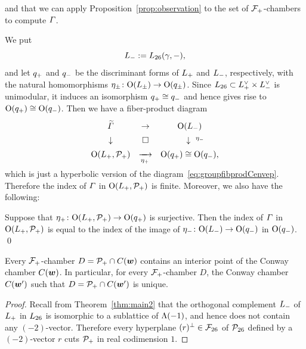 \documentclass{amsart} %
\begin{document}
and that we can apply
Proposition~\ref{prop:observation}
to the set of $\mathord{\mathcal{F}}_{+}$-chambers
to compute $\varGamma$.
%
\par
We put 
\[
L_{-}:=L_{26}(\gamma, -),
\]
and let $q_{+}$ and $q_{-}$ be the discriminant forms 
of $L_{+}$ and $L_{-}$, respectively,
with the natural homomorphisms $\eta_{\pm}\colon \mathord{\mathrm{O}}(L_{\pm})\to \mathord{\mathrm{O}}(q_{\pm})$.
Since  $L_{26}\subset L_{+}^{\vee}\times L_{-}^{\vee}$  is unimodular, 
it  induces an isomorphism $q_{+}\cong q_{-}$ and hence gives rise to 
$\mathord{\mathrm{O}}(q_{+})\cong \mathord{\mathrm{O}}(q_{-})$.
Then we have 
a  fiber-product diagram
%
\begin{equation}\label{eq:groupfibprodP}
\renewcommand{\arraystretch}{1.4}
\begin{array}{ccc}
\tilvGam &\to & \OG(\Lminus) \\
\downarrow & \square& \downarrow\rlap{ ${}^{\etaminus}$} \\
\OG(\Lplus, \PPPplus) & \maprightsb{\etaplus} & \OG(\qplus)\cong \OG(\qminus), 
\end{array}
\end{equation}
% 
which is just 
a hyperbolic version of the diagram~\eqref{eq:groupfibprodCenvep}.
Therefore the index of $\varGamma$ in $\mathord{\mathrm{O}}(L_{+}, \mathord{\mathcal{P}}_{+})$ is finite.
Moreover, we also have the following:
%
\begin{proposition}\label{prop:vGamindex}
Suppose that  %
${\eta}_{+}\colon \mathord{\mathrm{O}}(L_{+}, \mathord{\mathcal{P}}_{+}) \to \mathord{\mathrm{O}}(q_{+})$ is surjective.
Then the  index of $\varGamma$ in $\mathord{\mathrm{O}}(L_{+}, \mathord{\mathcal{P}}_{+})$  
is equal to  the index  of the image 
of ${\eta}_{-}\colon \mathord{\mathrm{O}}(L_{-}) \to \mathord{\mathrm{O}}(q_{-})$ 
in $\mathord{\mathrm{O}}(q_{-})$.
\qed
\end{proposition}
%
%
%
\begin{proposition}\label{prop:interior}
Every $\mathord{\mathcal{F}}_{+}$-chamber $D=\mathord{\mathcal{P}}_{+} \cap \mathord{C}(\boldsymbol{w})$
contains an interior point of the Conway chamber $ \mathord{C}(\boldsymbol{w})$.
In particular, for every $\mathord{\mathcal{F}}_{+}$-chamber $D$,
the Conway chamber $ \mathord{C}(\boldsymbol{w}^{\prime}) $
such that $D=\mathord{\mathcal{P}}_{+} \cap \mathord{C}(\boldsymbol{w}^{\prime})$ is unique.
\end{proposition}
%
\begin{proof}
Recall from Theorem~\ref{thm:main2} that 
the orthogonal complement $L_{-}$
 of $L_{+}$ in $L_{26}$
is isomorphic to a sublattice of $\Lambda(-1)$,
and hence does not contain any $(-2)$-vector.
Therefore every hyperplane $(r)^{\perp}\in {\mathord{\mathcal{F}}}_{26}$ of $\mathord{\mathcal{P}}_{26}$ defined by a $(-2)$-vector $r$ 
cuts $\mathord{\mathcal{P}}_{+}$ in real codimension $1$.
\end{proof}
\end{document}

